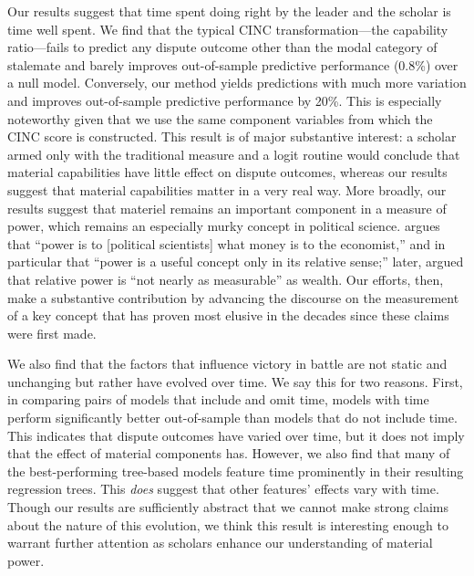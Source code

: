 Our results suggest that time spent doing right by the leader and the scholar is time well spent.  
We find that the typical CINC transformation---the capability ratio---fails to predict any dispute outcome other than the modal category of stalemate and barely improves out-of-sample predictive performance (0.8\%) over a null model.
Conversely, our method yields predictions with much more variation and improves out-of-sample predictive performance by 20\%.  This is especially noteworthy given that we use the same component variables from which the CINC score is constructed. 
This result is of major substantive interest:  a scholar armed only with the traditional measure and a logit routine would conclude that material capabilities have little effect on dispute outcomes, whereas our results suggest that material capabilities matter in a very real way.
More broadly, our results suggest that materiel remains an important component in a measure of power, which remains an especially murky concept in political science.
\citet[420]{singer1963inter} argues that ``power is to [political scientists] what money is to the economist,'' and in particular that ``power is a useful concept only in its relative sense;'' later, \citet[25]{singer1972} argued that relative power is ``not nearly as measurable'' as wealth.  
Our efforts, then, make a substantive contribution by advancing the discourse on the measurement of a key concept that has proven most elusive in the decades since these claims were first made.

We also find that the factors that influence victory in battle are not static and unchanging but rather have evolved over time.
We say this for two reasons.
First, in comparing pairs of models that include and omit time, models with time perform significantly better out-of-sample than models that do not include time.
This indicates that dispute outcomes have varied over time, but it does not imply that the effect of material components has.
However, we also find that many of the best-performing tree-based models feature time prominently in their resulting regression trees.
This \emph{does} suggest that other features' effects vary with time.
Though our results are sufficiently abstract that we cannot make strong claims about the nature of this evolution, we think this result is interesting enough to warrant further attention as scholars enhance our understanding of material power.

